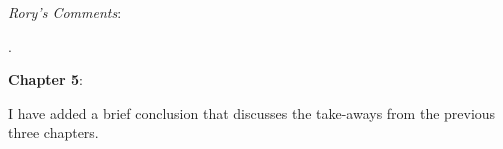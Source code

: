 \documentclass[12pt,stdletter,dateno,sigleft]{newlfm} %
\begin{document}
\begin{newlfm}
\textit{Rory's Comments}:

.\newline 


\textbf{Chapter 5}: 

I have added a brief conclusion that discusses the take-aways from the previous three chapters.



\end{newlfm}
\end{document}
